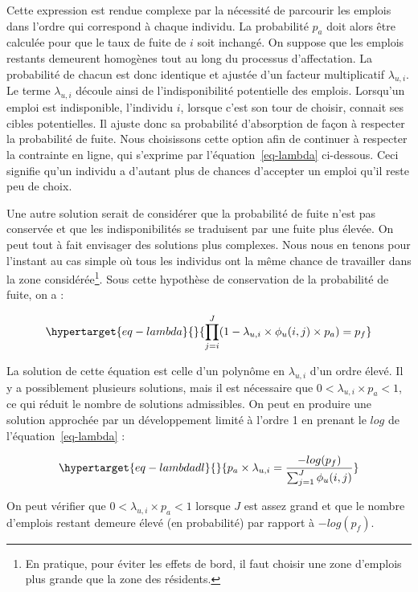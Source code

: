 \documentclass[
  10pt,
  a4paper,
  numbers=noendperiod,
  DIV=12]{scrartcl}
\begin{document}
Cette expression est rendue complexe par la nécessité de parcourir les
emplois dans l'ordre qui correspond à chaque individu. La probabilité
\(p_a\) doit alors être calculée pour que le taux de fuite de \(i\) soit
inchangé. On suppose que les emplois restants demeurent homogènes tout
au long du processus d'affectation. La probabilité de chacun est donc
identique et ajustée d'un facteur multiplicatif \(\lambda_{u,i}\). Le
terme \(\lambda_{u,i}\) découle ainsi de l'indisponibilité potentielle
des emplois. Lorsqu'un emploi est indisponible, l'individu \(i\),
lorsque c'est son tour de choisir, connait ses cibles potentielles. Il
ajuste donc sa probabilité d'absorption de façon à respecter la
probabilité de fuite. Nous choisissons cette option afin de continuer à
respecter la contrainte en ligne, qui s'exprime par
l'équation~\ref{eq-lambda} ci-dessous. Ceci signifie qu'un individu a
d'autant plus de chances d'accepter un emploi qu'il reste peu de choix.

Une autre solution serait de considérer que la probabilité de fuite
n'est pas conservée et que les indisponibilités se traduisent par une
fuite plus élevée. On peut tout à fait envisager des solutions plus
complexes. Nous nous en tenons pour l'instant au cas simple où tous les
individus ont la même chance de travailler dans la zone
considérée\footnote{En pratique, pour éviter les effets de bord, il faut
  choisir une zone d'emplois plus grande que la zone des résidents.}.
Sous cette hypothèse de conservation de la probabilité de fuite, on a :

\begin{equation}\protect\hypertarget{eq-lambda}{}{
\prod_{j=i} ^{J} (1-\lambda_{u,i} \times \phi_u(i,j) \times p_{a})= p_f
}\label{eq-lambda}\end{equation}

La solution de cette équation est celle d'un polynôme en
\(\lambda_{u,i}\) d'un ordre élevé. Il y a possiblement plusieurs
solutions, mais il est nécessaire que \(0<\lambda_{u,i}\times p_a<1\),
ce qui réduit le nombre de solutions admissibles. On peut en produire
une solution approchée par un développement limité à l'ordre 1 en
prenant le \(log\) de l'équation~\ref{eq-lambda} :

\begin{equation}\protect\hypertarget{eq-lambdadl}{}{
p_{a} \times \lambda_{u,i} = \frac {-log(p_f)}{\sum_{j=1} ^{J} \phi_u(i,j)}
}\label{eq-lambdadl}\end{equation}

On peut vérifier que \(0<\lambda_{u,i}\times p_a<1\) lorsque \(J\) est
assez grand et que le nombre d'emplois restant demeure élevé (en
probabilité) par rapport à \(-log(p_f)\).
\end{document}
